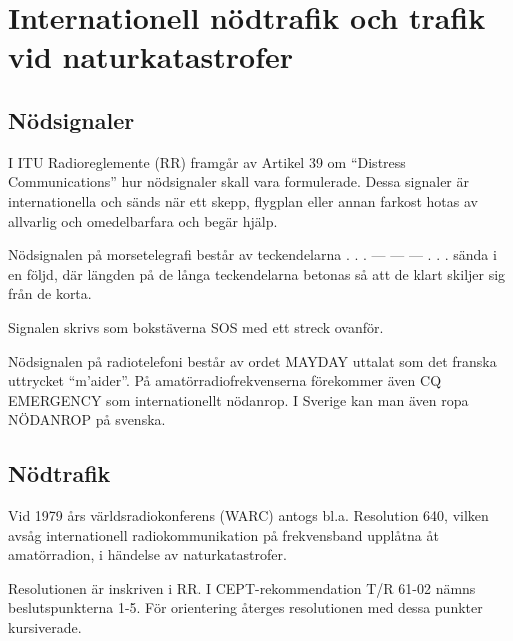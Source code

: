 \section{Internationell nödtrafik och trafik vid naturkatastrofer}

\subsection{Nödsignaler}

I ITU Radioreglemente (RR) framgår av Artikel 39 om ``Distress Communications''
hur nödsignaler skall vara formulerade. Dessa signaler är internationella och
sänds när ett skepp, flygplan eller annan farkost hotas av allvarlig och
omedelbarfara och begär hjälp.

Nödsignalen på morsetelegrafi består av teckendelarna . . . --- --- --- . . .
sända i en följd, där längden på de långa teckendelarna betonas så att de klart
skiljer sig från de korta.

Signalen skrivs som bokstäverna SOS med ett streck ovanför.

Nödsignalen på radiotelefoni består av ordet MAYDAY uttalat som det franska
uttrycket ``m'aider''.  På amatörradiofrekvenserna förekommer även CQ EMERGENCY
som internationellt nödanrop. I Sverige kan man även ropa NÖDANROP på svenska.

\subsection{Nödtrafik}

Vid 1979 års världsradiokonferens (WARC) antogs bl.a. Resolution 640, vilken
avsåg internationell radiokommunikation på frekvensband upplåtna åt
amatörradion, i händelse av naturkatastrofer.

Resolutionen är inskriven i RR. I CEPT-rekommendation T/R 61-02 nämns
beslutspunkterna 1-5. För orientering återges resolutionen med dessa punkter
kursiverade.

